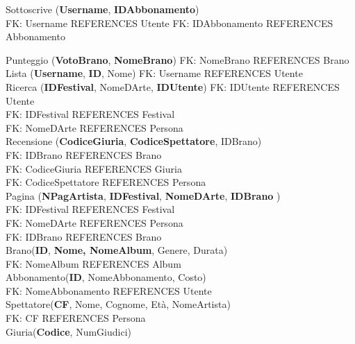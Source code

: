 \documentclass{article}
\begin{document}
Sottoscrive (\textbf{Username}, \textbf{IDAbbonamento}) \\
FK: Username REFERENCES Utente\newline
FK: IDAbbonamento REFERENCES Abbonamento\newline

Punteggio (\textbf{VotoBrano}, \textbf{NomeBrano})\newline
FK: NomeBrano REFERENCES Brano\\

Lista (\textbf{Username}, \textbf{ID}, Nome)\newline
FK: Username REFERENCES Utente\\

Ricerca (\textbf{IDFestival}, NomeDArte, \textbf{IDUtente}) \newline
FK: IDUtente REFERENCES Utente\\
FK: IDFestival REFERENCES Festival\\
FK: NomeDArte REFERENCES Persona \\

Recensione (\textbf{CodiceGiuria}, \textbf{CodiceSpettatore}, IDBrano)\\
FK: IDBrano REFERENCES Brano \\
FK: CodiceGiuria REFERENCES Giuria\\
FK: CodiceSpettatore REFERENCES Persona\\

Pagina (\textbf{NPagArtista}, \textbf{IDFestival}, \textbf{NomeDArte}, \textbf{IDBrano} )
\\
FK: IDFestival REFERENCES Festival\\
FK: NomeDArte REFERENCES Persona\\
FK: IDBrano REFERENCES Brano\\

Brano(\textbf{ID}, \textbf{Nome, NomeAlbum}, Genere, Durata)\\
FK: NomeAlbum REFERENCES Album \\

Abbonamento(\textbf{ID}, NomeAbbonamento, Costo)\\
FK: NomeAbbonamento REFERENCES Utente \\

Spettatore(\textbf{CF}, Nome, Cognome, Età, NomeArtista) \\
FK: CF REFERENCES Persona \\

Giuria(\textbf{Codice}, NumGiudici)
\end{document}
